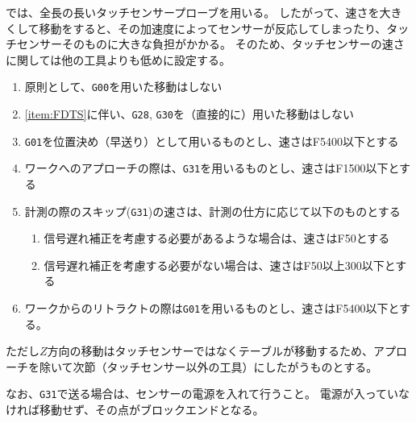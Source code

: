 \DMname では、全長の長いタッチセンサープローブを用いる。
したがって、速さを大きくして移動をすると、その加速度によってセンサーが反応してしまったり、タッチセンサーそのものに大きな負担がかかる。
そのため、タッチセンサーの速さに関しては他の工具よりも低めに設定する。
\begin{enumerate}[label=\Roman*., ref=\Roman*]
\item \label{item:FDTS} 原則として、\verb|G00|を用いた移動はしない
\item \ref{item:FDTS}に伴い、\verb|G28|, \verb|G30|を（直接的に）用いた移動はしない
\item \verb|G01|を位置決め（早送り）として用いるものとし、速さはF5400以下とする
\item ワークへのアプローチの際は、\verb|G31|を用いるものとし、速さはF1500以下とする
\item 計測の際のスキップ(\verb|G31|)の速さは、計測の仕方に応じて以下のものとする
  \begin{enumerate}
  \item {}信号遅れ補正を考慮する必要があるような場合は、速さはF50とする
  \item 信号遅れ補正を考慮する必要がない場合は、速さはF50以上300以下とする
  \end{enumerate}
\item ワークからのリトラクトの際は\verb|G01|を用いるものとし、速さはF5400以下とする。
\end{enumerate}
ただし$Z$方向の移動はタッチセンサーではなくテーブルが移動するため、アプローチを除いて次節（タッチセンサー以外の工具）にしたがうものとする。

なお、\verb|G31|で送る場合は、センサーの電源を入れて行うこと。
電源が入っていなければ移動せず、その点がブロックエンドとなる。



